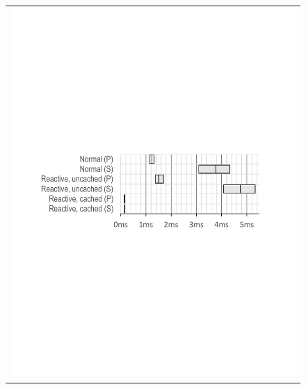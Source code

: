 \begin{figure}
\begin{tabular}{c}
\includegraphics[width=\columnwidth, viewport=67 322 534 477]{figs/query-latencies}\\[.2in]

\end{tabular}
\end{figure}
